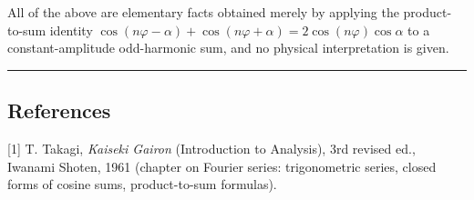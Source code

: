 \documentclass[
]{ltjsarticle}
\begin{document}
All of the above are elementary facts obtained merely by applying the
product-to-sum identity
\(\cos(n\varphi-\alpha)+\cos(n\varphi+\alpha)=2\cos(n\varphi)\cos\alpha\)
to a constant-amplitude odd-harmonic sum, and no physical interpretation
is given.

\begin{center}\rule{0.5\linewidth}{0.5pt}\end{center}

\subsection{References}\label{references}

{[}1{]} T. Takagi, \emph{Kaiseki Gairon} (Introduction to Analysis), 3rd
revised ed., Iwanami Shoten, 1961 (chapter on Fourier series:
trigonometric series, closed forms of cosine sums, product-to-sum
formulas).
\end{document}
